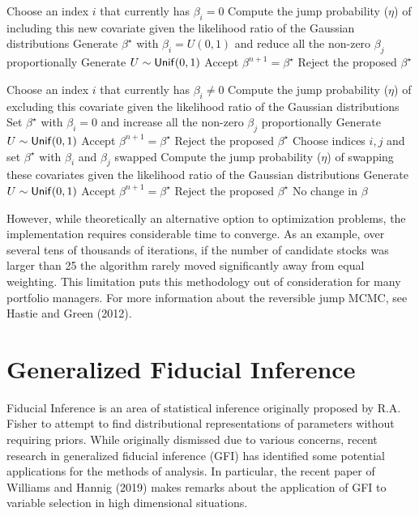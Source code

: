 \documentclass[a4paper, 12pt]{article}
\theoremstyle{plain}
\theoremstyle{definition}
\theoremstyle{remark}
\newcommand{\unif}{{\sf Unif}}
\begin{document}
\begin{algorithm}
\begin{algorithmic}
	\State Choose an index $i$ that currently has $\beta_i=0$
	\State Compute the jump probability ($\eta$) of including this new covariate given the likelihood ratio of the Gaussian distributions
	\State Generate $\beta^\star$ with $\beta_i=U(0,1)$ and reduce all the non-zero $\beta_j$ proportionally
	\State Generate $U\sim \unif(0,1)$
		\State Accept $\beta^{n+1}=\beta^\star$
	\Else
		\State Reject the proposed $\beta^\star$
	\EndIf

	\State Choose an index $i$ that currently has $\beta_i \neq 0$
	\State Compute the jump probability ($\eta$) of excluding this covariate given the likelihood ratio of the Gaussian distributions
	\State Set $\beta^\star$ with $\beta_i=0$ and increase all the non-zero $\beta_j$ proportionally
	\State Generate $U\sim \unif(0,1)$
		\State Accept $\beta^{n+1}=\beta^\star$
	\Else
		\State Reject the proposed $\beta^\star$
	\EndIf
{}
	\State Choose indices $i, j$ and set $\beta^\star$ with $\beta_i$ and $\beta_j$ swapped
	\State Compute the jump probability ($\eta$) of swapping these covariates given the likelihood ratio of the Gaussian distributions
	\State Generate $U\sim \unif(0,1)$
		\State Accept $\beta^{n+1}=\beta^\star$
	\Else
		\State Reject the proposed $\beta^\star$
	\EndIf
\Else
	\State No change in $\beta$
\EndIf
\EndWhile
\end{algorithmic}
\end{algorithm}

However, while theoretically an alternative option to optimization problems, the implementation requires considerable time to converge. As an example, over several tens of thousands of iterations, if the number of candidate stocks was larger than 25 the algorithm rarely moved significantly away from equal weighting. This limitation puts this methodology out of consideration for many portfolio managers.
For more information about the reversible jump MCMC, see Hastie and Green (2012).

\section{Generalized Fiducial Inference}
Fiducial Inference is an area of statistical inference originally proposed by R.A. Fisher to attempt to find distributional representations of parameters without requiring priors. While originally dismissed due to various concerns, recent research in generalized fiducial inference (GFI) has identified some potential applications for the methods of analysis. In particular, the recent paper of Williams and Hannig (2019) makes remarks about the application of GFI to variable selection in high dimensional situations.
\end{document}
